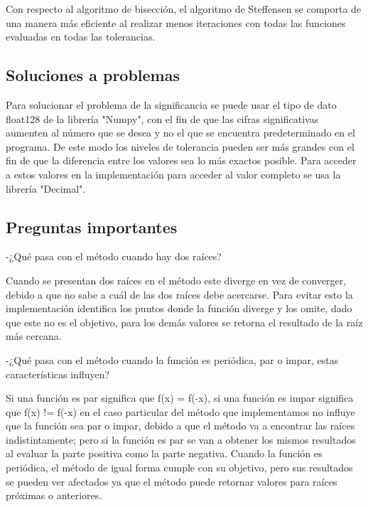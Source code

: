 \documentclass[]{hdsr}
\begin{document}
Con respecto al algoritmo de bisección, el algoritmo de Steffensen se comporta de una manera más eficiente al realizar menos iteraciones con todas las funciones evaluadas en todas las tolerancias.

\subsection{Soluciones a problemas}\newline
Para solucionar el problema de la significancia se puede usar el tipo de dato float128 de la librería "Numpy", con el fin de que las cifras significativas aumenten al número que se desea y no el que se encuentra predeterminado en el programa. De este modo los niveles de tolerancia pueden ser más grandes con el fin de que la diferencia entre los valores sea lo más exactos posible. Para acceder a estos valores en la implementación para acceder al valor completo se usa la librería "Decimal".

\subsection{Preguntas importantes}
-¿Qué pasa con el método cuando hay dos raíces?

Cuando se presentan dos raíces en el método este diverge en vez de converger, debido a que no sabe a cuál de las dos raíces debe acercarse. Para evitar esto la implementación identifica los puntos donde la función diverge y los omite, dado que este no es el objetivo, para los demás valores se retorna el resultado de la raíz más cercana.\newline

-¿Qué pasa con el método cuando la función es periódica, par o impar, estas características influyen?

Si una función es par significa que f(x) = f(-x), si una función es impar significa que f(x) != f(-x) en el caso particular del método que implementamos no influye que la función sea par o impar, debido a que el método va a encontrar las raíces indistintamente; pero si la función es par se van a obtener los mismos resultados al evaluar la parte positiva como la parte negativa. Cuando la función es periódica, el método de igual forma cumple con su objetivo, pero sus resultados se pueden ver afectados ya que el método puede retornar valores para raíces próximas o anteriores.\newline
\end{document}
